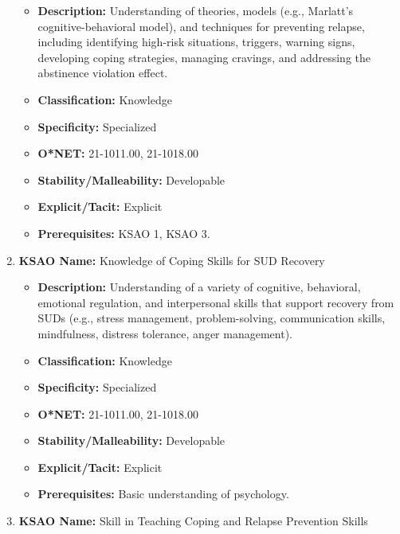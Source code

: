\documentclass[
  letterpaper,
  DIV=11,
  numbers=noendperiod]{scrartcl}
\providecommand{\tightlist}{%
  \setlength{\itemsep}{0pt}\setlength{\parskip}{0pt}}
\begin{document}
\begin{enumerate}
  \begin{itemize}
  \tightlist
  \item
    \textbf{Description:} Understanding of theories, models (e.g.,
    Marlatt's cognitive-behavioral model), and techniques for preventing
    relapse, including identifying high-risk situations, triggers,
    warning signs, developing coping strategies, managing cravings, and
    addressing the abstinence violation effect.
  \item
    \textbf{Classification:} Knowledge
  \item
    \textbf{Specificity:} Specialized
  \item
    \textbf{O*NET:} 21-1011.00, 21-1018.00
  \item
    \textbf{Stability/Malleability:} Developable
  \item
    \textbf{Explicit/Tacit:} Explicit
  \item
    \textbf{Prerequisites:} KSAO 1, KSAO 3.
  \end{itemize}
\item
  \textbf{KSAO Name:} Knowledge of Coping Skills for SUD Recovery

  \begin{itemize}
  \tightlist
  \item
    \textbf{Description:} Understanding of a variety of cognitive,
    behavioral, emotional regulation, and interpersonal skills that
    support recovery from SUDs (e.g., stress management,
    problem-solving, communication skills, mindfulness, distress
    tolerance, anger management).
  \item
    \textbf{Classification:} Knowledge
  \item
    \textbf{Specificity:} Specialized
  \item
    \textbf{O*NET:} 21-1011.00, 21-1018.00
  \item
    \textbf{Stability/Malleability:} Developable
  \item
    \textbf{Explicit/Tacit:} Explicit
  \item
    \textbf{Prerequisites:} Basic understanding of psychology.
  \end{itemize}
\item
  \textbf{KSAO Name:} Skill in Teaching Coping and Relapse Prevention
  Skills


\end{enumerate}
\end{document}
